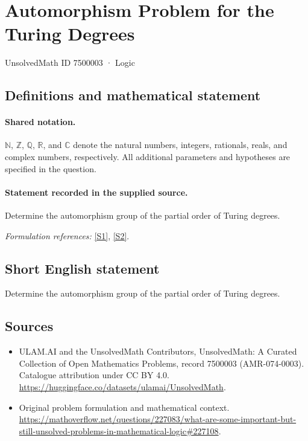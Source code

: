 \documentclass[11pt]{article}
\newcommand{\sref}[2]{\hyperlink{source:#1:#2}{[S#2]}}
\begin{document}
\setcounter{section}{7500002}
\section{Automorphism Problem for the Turing Degrees}\label{7500003}
{\small UnsolvedMath ID 7500003 · Logic}
\subsection{Definitions and mathematical statement}

\paragraph{Shared notation.}$\mathbb N$, $\mathbb Z$, $\mathbb Q$, $\mathbb R$, and $\mathbb C$ denote the natural numbers, integers, rationals, reals, and complex numbers, respectively. All additional parameters and hypotheses are specified in the question.


\paragraph{Statement recorded in the supplied source.}
Determine the automorphism group of the partial order of Turing degrees.
\par\smallskip\textit{Formulation references:} \sref{7500003}{1}, \sref{7500003}{2}.
\subsection{Short English statement}
Determine the automorphism group of the partial order of Turing degrees.
\subsection{Sources}
\begin{itemize}
\item[\hypertarget{source:7500003:1}{S1}] ULAM.AI and the UnsolvedMath Contributors, UnsolvedMath: A Curated Collection of Open Mathematics Problems, record 7500003 (AMR-074-0003). Catalogue attribution under CC BY 4.0.
\url{https://huggingface.co/datasets/ulamai/UnsolvedMath}.
\item[\hypertarget{source:7500003:2}{S2}] Original problem formulation and mathematical context.
\url{https://mathoverflow.net/questions/227083/what-are-some-important-but-still-unsolved-problems-in-mathematical-logic#227108}.
\end{itemize}
\label{end:7500003}
\end{document}
